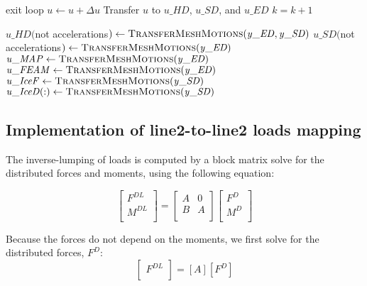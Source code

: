 \documentclass[10pt,letterpaper,oneside,notitlepage]{article}
\begin{document}
\begin{algorithmic}[1]
		\State    
		 
			\State exit loop
		\EndIf
		\State
		\State $u \gets u + \Delta u$
		\State Transfer $u$ to $\mathit{u\_HD}$, $\mathit{u\_SD}$, and $\mathit{u\_ED}$
		\State $k=k+1$
		
	\EndLoop	
	
	\State{}
	\State 
	
	\State$\mathit{u\_HD}($not accelerations$) \gets \Call{TransferMeshMotions}{\mathit{y\_ED},\mathit{y\_SD}}$
	\State$\mathit{u\_SD}($not accelerations$) \gets \Call{TransferMeshMotions}{\mathit{y\_ED}}$
  \State 
	\State $\mathit{u\_MAP}  \gets \Call{TransferMeshMotions}{\mathit{y\_ED}}$
	\State $\mathit{u\_FEAM} \gets \Call{TransferMeshMotions}{\mathit{y\_ED}}$
	\State $\mathit{u\_IceF} \gets \Call{TransferMeshMotions}{\mathit{y\_SD}}$
	\State $\mathit{u\_IceD(:)} \gets \Call{TransferMeshMotions}{\mathit{y\_SD}}$
			
\EndProcedure

\end{algorithmic}

\subsection {Implementation of line2-to-line2 loads mapping}
The inverse-lumping of loads is computed by a block matrix solve for the distributed forces and moments, 
using the following equation:

\begin{equation}
\label{EqLump}
	\begin{bmatrix}
	F^{DL} \\
	M^{DL} \\
	\end{bmatrix}
=
	\begin{bmatrix}
		A & 0 \\
		B & A \\	
	\end{bmatrix}
	\begin{bmatrix}
	F^{D} \\
	M^{D} \\
	\end{bmatrix}
\end{equation}

Because the forces do not depend on the moments, we first solve for the distributed forces, $F^D$:
\begin{equation}
\label{EqLumpF}
	\begin{bmatrix}	F^{DL} \\	\end{bmatrix}
=
	\left[		A    \right]
	\left[	F^{D}  \right]
\end{equation}
\end{document}
